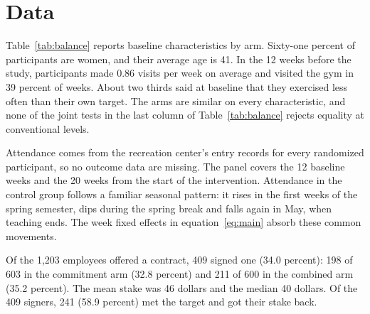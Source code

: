 \section{Data}
\label{sec:data}
Table~\ref{tab:balance} reports baseline characteristics by arm. Sixty-one percent of participants are women, and their average age is 41. In the 12 weeks before the study, participants made 0.86 visits per week on average and visited the gym in 39 percent of weeks. About two thirds said at baseline that they exercised less often than their own target. The arms are similar on every characteristic, and none of the joint tests in the last column of Table~\ref{tab:balance} rejects equality at conventional levels.

Attendance comes from the recreation center's entry records for every randomized participant, so no outcome data are missing. The panel covers the 12 baseline weeks and the 20 weeks from the start of the intervention. Attendance in the control group follows a familiar seasonal pattern: it rises in the first weeks of the spring semester, dips during the spring break and falls again in May, when teaching ends. The week fixed effects in equation~\eqref{eq:main} absorb these common movements.

Of the 1,203 employees offered a contract, 409 signed one (34.0 percent): 198 of 603 in the commitment arm (32.8 percent) and 211 of 600 in the combined arm (35.2 percent). The mean stake was 46 dollars and the median 40 dollars. Of the 409 signers, 241 (58.9 percent) met the target and got their stake back.


